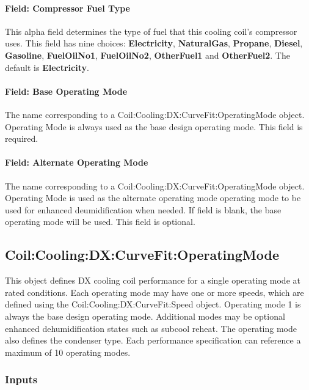 \paragraph{Field: Compressor Fuel Type}\label{field-compressor-fuel-type-000}

This alpha field determines the type of fuel that this cooling coil's compressor uses. This field has nine choices: \textbf{Electricity}, \textbf{NaturalGas}, \textbf{Propane}, \textbf{Diesel}, \textbf{Gasoline}, \textbf{FuelOilNo1}, \textbf{FuelOilNo2}, \textbf{OtherFuel1} and \textbf{OtherFuel2}. The default is \textbf{Electricity}.

\paragraph{Field: Base Operating Mode}\label{field-base-operating-mode}

The name corresponding to a Coil:Cooling:DX:CurveFit:OperatingMode object. Operating Mode is always used as the base design operating mode. This field is required.

\paragraph{Field: Alternate Operating Mode}\label{field-alternate-operating-mode}

The name corresponding to a Coil:Cooling:DX:CurveFit:OperatingMode object. Operating Mode is used as the alternate operating mode operating mode to be used for enhanced deumidification when needed. If field is blank, the base operating mode will be used. This field is optional.

\subsection{Coil:Cooling:DX:CurveFit:OperatingMode}\label{coilcoolingdxcurvefitoperatingmode}

This object defines DX cooling coil performance for a single operating mode at rated conditions. Each operating mode may have one or more speeds, which are defined using the Coil:Cooling:DX:CurveFit:Speed object. Operating mode 1 is always the base design operating mode. Additional modes may be optional enhanced dehumidification states such as subcool reheat. The operating mode also defines the condenser type. Each performance specification can reference a maximum of 10 operating modes.

\subsubsection{Inputs}\label{inputs-03}

